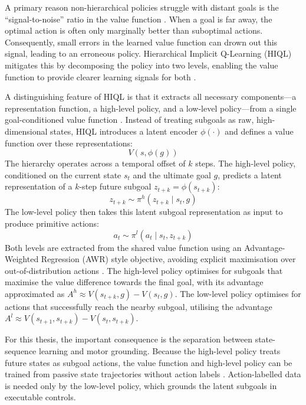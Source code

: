 A primary reason non-hierarchical policies struggle with distant goals is the ``signal-to-noise'' ratio in the value function \cite{park2024hiqlofflinegoalconditionedrl}. When a goal is far away, the optimal action is often only marginally better than suboptimal actions. Consequently, small errors in the learned value function can drown out this signal, leading to an erroneous policy. Hierarchical Implicit Q-Learning (HIQL) mitigates this by decomposing the policy into two levels, enabling the value function to provide clearer learning signals for both \cite{park2024hiqlofflinegoalconditionedrl}. 

A distinguishing feature of HIQL is that it extracts all necessary components---a representation function, a high-level policy, and a low-level policy---from a single goal-conditioned value function \cite{park2024hiqlofflinegoalconditionedrl}. Instead of treating subgoals as raw, high-dimensional states, HIQL introduces a latent encoder $\phi(\cdot)$ and defines a value function over these representations:
\begin{equation}
    V(s, \phi(g))
\end{equation}
The hierarchy operates across a temporal offset of $k$ steps. The high-level policy, conditioned on the current state $s_t$ and the ultimate goal $g$, predicts a latent representation of a $k$-step future subgoal $z_{t+k} = \phi(s_{t+k})$:
\begin{equation}
    z_{t+k} \sim \pi^h(z_{t+k} \mid s_t, g)
\end{equation}
The low-level policy then takes this latent subgoal representation as input to produce primitive actions:
\begin{equation}
    a_t \sim \pi^l(a_t \mid s_t, z_{t+k})
\end{equation}
Both levels are extracted from the shared value function using an Advantage-Weighted Regression (AWR) style objective, avoiding explicit maximisation over out-of-distribution actions \cite{peng2019advantageweightedregressionsimplescalable, park2024hiqlofflinegoalconditionedrl}. The high-level policy optimises for subgoals that maximise the value difference towards the final goal, with its advantage approximated as $A^h \approx V(s_{t+k}, g) - V(s_t, g)$. The low-level policy optimises for actions that successfully reach the nearby subgoal, utilising the advantage $A^l \approx V(s_{t+1}, s_{t+k}) - V(s_t, s_{t+k})$.

For this thesis, the important consequence is the separation between
state-sequence learning and motor grounding. Because the high-level
policy treats future states as subgoal actions, the value function and
high-level policy can be trained from passive state trajectories without
action labels \cite{park2024hiqlofflinegoalconditionedrl}. Action-labelled
data is needed only by the low-level policy, which grounds the latent
subgoals in executable controls.

